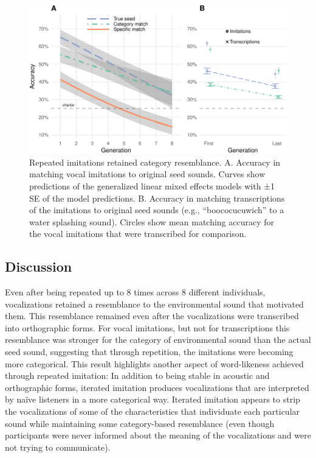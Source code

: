 \documentclass[english,floatsintext,man]{apa6}
\theoremstyle{definition}
\theoremstyle{definition}
\theoremstyle{definition}
\theoremstyle{remark}
\begin{document}
\begin{figure}
\centering
\includegraphics{fig4-1.pdf}
\caption{\label{fig:fig4}Repeated imitations retained category resemblance.
A. Accuracy in matching vocal imitations to original seed sounds. Curves
show predictions of the generalized linear mixed effects models with ±1
SE of the model predictions. B. Accuracy in matching transcriptions of
the imitations to original seed sounds (e.g., \enquote{boococucuwich} to
a water splashing sound). Circles show mean matching accuracy for the
vocal imitations that were transcribed for comparison.}
\end{figure}

\hypertarget{discussion-1}{%
\subsection{Discussion}\label{discussion-1}}

Even after being repeated up to 8 times across 8 different individuals,
vocalizations retained a resemblance to the environmental sound that
motivated them. This resemblance remained even after the vocalizations
were transcribed into orthographic forms. For vocal imitations, but not
for transcriptions this resemblance was stronger for the category of
environmental sound than the actual seed sound, suggesting that through
repetition, the imitations were becoming more categorical. This result
highlights another aspect of word-likeness achieved through repeated
imitation: In addition to being stable in acoustic and orthographic
forms, iterated imitation produces vocalizations that are interpreted by
naïve listeners in a more categorical way. Iterated imitation appears to
strip the vocalizations of some of the characteristics that individuate
each particular sound while maintaining some category-based resemblance
(even though participants were never informed about the meaning of the
vocalizations and were not trying to communicate).
\end{document}
